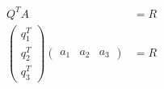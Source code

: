 \begin{frame}
\begin{columns}
\begin{column}{0.67\textwidth}
      \begin{exampleblock}{}
        \begin{align}
          Q^{T}A&=R \\
          \begin{pmatrix}
            q_1^T \\ q_2^T \\ q_3^T
          \end{pmatrix}
          \begin{pmatrix}
            a_1 & a_2 & a_3
          \end{pmatrix}
          &=R
        \end{align}
      \end{exampleblock}
    \end{column}
  \end{columns}
\end{frame}


